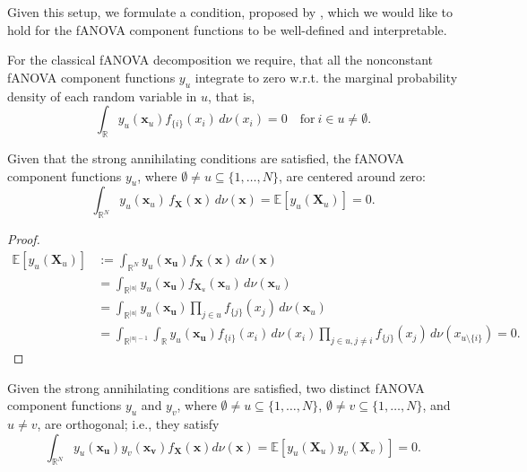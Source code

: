 Given this setup, we formulate a condition, proposed by \cite{rahman2014}, which we would like to hold for the fANOVA component functions to be well-defined and interpretable.
\begin{condition}\label{cond:strong_annihilating_conditions}
    For the classical fANOVA decomposition we require, that all the nonconstant fANOVA component functions $y_u$ integrate to zero w.r.t. the marginal probability density of each random variable in $u$, that is,
\begin{equation}
    \int_{\mathbb{R}} y_u(\boldsymbol{x}_u) f_{\{i\}}(x_i) \, d\nu(x_i) = 0 \quad \text{for} \ i \in u \neq \emptyset.
\end{equation}
\end{condition}

\begin{proposition}\label{prop:zero_mean_classical}
Given that the strong annihilating conditions are satisfied, 
the fANOVA component functions $y_u$, where 
$\emptyset \neq u \subseteq \{1,\dots,N\}$, are centered around zero:
\begin{equation}
    \int_{\mathbb{R}^N} 
        y_u(\boldsymbol{x}_u)\, f_{\boldsymbol{X}}(\boldsymbol{x}) 
        \, d\nu (\boldsymbol{x})
    = \mathbb{E}[y_u(\boldsymbol{X}_u)] 
    = 0.
\end{equation}
\end{proposition}

\begin{proof}
\begin{align*}
    \mathbb{E}[y_u(\boldsymbol{X}_u)] &:= \int_{\mathbb{R}^{N}} y_u(\boldsymbol{x_u}) f_{\boldsymbol{X}}(\boldsymbol{x}) \, d\nu (\boldsymbol{x}) \\[0.5em]
    &= \int_{\mathbb{R}^{|u|}} y_u(\boldsymbol{x_u}) f_{\boldsymbol{X}_u}(\boldsymbol{x}_u) \, d\nu (\boldsymbol{x}_u) \\[0.5em]
    &= \int_{\mathbb{R}^{|u|}} y_u(\boldsymbol{x_u}) \prod_{j \in u} f_{\{j\}}(x_j) \, d\nu (\boldsymbol{x}_u) \\[0.5em]
    &= \int_{\mathbb{R}^{|u|-1}} \int_{\mathbb{R}} y_u(\boldsymbol{x_u}) f_{\{i\}}(x_i) \, d\nu(x_i) \prod_{j \in u, j \neq i} f_{\{j\}}(x_j) \, d\nu (x_{u \setminus \{i\}}) = 0.
\end{align*}
\end{proof}

\begin{proposition}\label{prop:orthogonality_classical}
    Given the strong annihilating conditions are satisfied, two distinct fANOVA component functions $y_u$ and $y_v$, where $\emptyset \neq u \subseteq \{1,\ldots,N\}$, $\emptyset \neq v \subseteq \{1,\ldots,N\}$, and $u \neq v$, are orthogonal; i.e., they satisfy
\begin{equation}
    \int_{\mathbb{R}^N} y_u(\boldsymbol{x_u}) y_v(\boldsymbol{x_v}) f_{\boldsymbol{X}}(\boldsymbol{x}) d\nu (\boldsymbol{x}) = \mathbb{E}[y_u(\boldsymbol{X}_u) y_v(\boldsymbol{X}_v)] = 0.
\end{equation}
\end{proposition}

